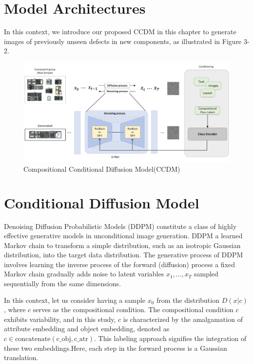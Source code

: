 \section{Model Architectures}
 In this context, we introduce our proposed CCDM in this chapter to generate images of previously unseen defects in new components, as illustrated in Figure 3-2. 
\begin{figure}[H]
    \centering
    \includegraphics[width=1\linewidth]{Conditional Diffusion model.png}
    \caption{Compositional Conditional Diffusion Model(CCDM)}
    \label{fig:enter-label}
\end{figure}


\section{Conditional Diffusion Model}
Denoising Diffusion Probabilistic Models (DDPM)\cite{DDPM} constitute a class of highly effective generative models in unconditional image generation. DDPM a learned Markov chain to transform a simple distribution, such as an isotropic Gaussian distribution, into the target data distribution. The generative process of DDPM involves learning the inverse process of the forward (diffusion) process a fixed Markov chain gradually adds noise to latent variables \(x_1, ..., x_T\) sampled sequentially from the same dimensions.

In this context, let us consider having a sample  \(x_0\) from the distribution \(D(x|c)\), where \(c\) serves as the compositional condition. The compositional condition \(c\) exhibits variability, and in this study, \(c\) is characterized by the amalgamation of attribute embedding and object embedding, denoted as \(c \in \text{concatenate}(\text{c_{obj}}, \text{c_{atr}})\). This labeling approach signifies the integration of these two embeddings.Here, each step in the forward process is a Gaussian translation. 

